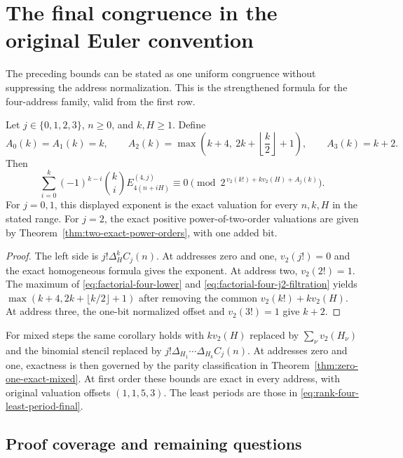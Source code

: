 \section{The final congruence in the original Euler convention}
\label{sec:final-original-congruence}

The preceding bounds can be stated as one uniform congruence without
suppressing the address normalization. This is the strengthened formula
for the four-address family, valid from the first row.

\begin{corollary}
\label{cor:final-euler-congruence}
Let $j\in\{0,1,2,3\}$, $n\geq0$, and $k,H\geq1$. Define
\[
 A_0(k)=A_1(k)=k,\qquad
 A_2(k)=\max\left(k+4,\ 2k+\left\lfloor\frac k2\right\rfloor+1\right),
 \qquad A_3(k)=k+2.
\]
Then
\begin{equation}
 \boxed{\displaystyle
 \sum_{i=0}^k(-1)^{k-i}\binom ki E_{4(n+iH)}^{(4,j)}
       \equiv0\pmod{2^{\,v_2(k!)+k v_2(H)+A_j(k)}}.}
 \label{eq:boxed-final-euler-congruence}
\end{equation}
For $j=0,1$, this displayed exponent is the exact valuation for every
$n,k,H$ in the stated range. For $j=2$, the exact positive
power-of-two-order valuations are given by
Theorem~\ref{thm:two-exact-power-orders}, with one added bit.
\end{corollary}

\begin{proof}
The left side is $j!\Delta_H^kC_j(n)$.
At addresses zero and one, $v_2(j!)=0$ and the exact homogeneous
formula gives the exponent. At address two, $v_2(2!)=1$. The maximum
of \eqref{eq:factorial-four-lower} and
\eqref{eq:factorial-four-j2-filtration} yields
$\max(k+4,2k+\lfloor k/2\rfloor+1)$ after removing the common
$v_2(k!)+k v_2(H)$. At address three, the one-bit normalized offset
and $v_2(3!)=1$ give $k+2$.
\end{proof}

For mixed steps the same corollary holds with $k v_2(H)$ replaced by
$\sum_\nu v_2(H_\nu)$ and the binomial stencil replaced by
$j!\Delta_{H_1}\cdots\Delta_{H_k}C_j(n)$.
At addresses zero and one, exactness is then governed by the parity
classification in Theorem~\ref{thm:zero-one-exact-mixed}.
At first order these bounds are exact in every address, with original
valuation offsets $(1,1,5,3)$. The least periods are those in
\eqref{eq:rank-four-least-period-final}.

\subsection{Proof coverage and remaining questions}

